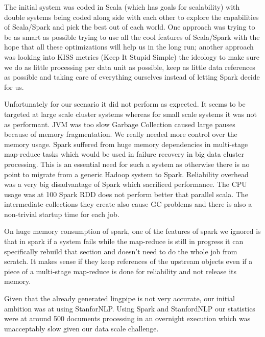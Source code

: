 The initial system was coded in Scala (which has goals for scalability) with double systems being coded along side with each other to explore the capabilities of Scala/Spark and pick the best out of each world. One approach was trying to be as smart as possible trying to use all the cool features of Scala/Spark with the hope that all these optimizations will help us in the long run; another approach was looking into KISS metrics (Keep It Stupid Simple) the ideology to make sure we do as little processing per data unit as possible, keep as little data references as possible and taking care of everything ourselves instead of letting Spark decide for us. 

Unfortunately for our scenario it did not perform as expected. It seems to be targeted at large scale cluster systems whereas for small scale systems it was not as performant. JVM was too slow Garbage Collection caused large pauses because of memory fragmentation. We really needed more control over the memory usage. Spark suffered from huge memory dependencies in multi-stage map-reduce tasks which would be used in failure recovery in big data cluster processing. This is an essential need for such a system as otherwise there is no point to migrate from a generic Hadoop system to Spark. Reliability overhead was a very big disadvantage of Spark which sacrificed performance. The CPU usage was at 100%
Spark RDD does not perform better that parallel scala. The intermediate collections they create also cause GC problems and there is also a non-trivial startup time for each job.

On huge memory consumption of spark, one of the features of spark we ignored is that in spark if a system fails while the map-reduce is still in progress it can specifically rebuild that section and doesn't need to do the whole job from scratch. It makes sense if they keep references of the upstream objects even if a piece of a multi-stage map-reduce is done for reliability and not release its memory.

Given that the already generated lingpipe is not very accurate, our initial ambition was at using StanforNLP. Using Spark and StanfordNLP our statistics were at around 500 documents processing in an overnight execution which was unacceptably slow given our data scale challenge.

